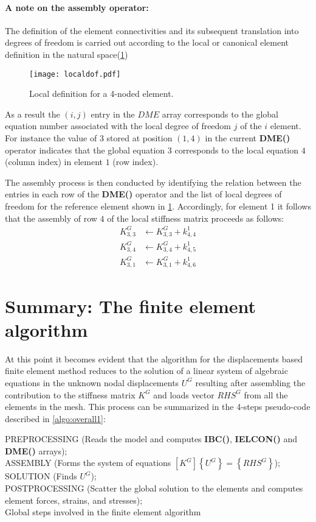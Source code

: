 \paragraph*{A note on the assembly operator:}
The definition of the element connectivities and its subsequent translation into degrees of freedom is carried out according to the local or canonical element definition in the natural space(\cref{fig:locdof})

\begin{figure}[H]
\centering
\texttt{[image: localdof.pdf]}
\caption{Local definition for a 4-noded element.}
\label{fig:locdof}
\end{figure}

As a result the $(i,j)$ entry in the $DME$ array corresponds to the global equation number associated with the local degree of freedom $j$ of the $i$ element. For instance the value of $3$ stored at position $(1,4)$ in the current {\bf DME()} operator indicates that the global equation $3$ corresponds to the local equation $4$ (column index) in element $1$ (row index).

The assembly process is then conducted by identifying the relation between the entries in each row of the {\bf DME()} operator and the list of local degrees of freedom for the reference element shown in \cref{fig:locdof}. Accordingly, for element 1 it follows that the assembly of row $4$ of the local stiffness matrix proceeds as follows:
\begin{align*}
K_{3,3}^G & \leftarrow  K_{3,3}^G + k_{4,4}^1 \\
K_{3,4}^G & \leftarrow  K_{3,4}^G + k_{4,5}^1 \\
K_{3,1}^G & \leftarrow  K_{3,1}^G + k_{4,6}^1
\end{align*}


\section{Summary: The finite element algorithm}
At this point it becomes evident that the algorithm for the displacements based finite element method reduces to the solution of a linear system of algebraic equations in the unknown nodal displacements $U^G$ resulting after assembling the contribution to the stiffness matrix $K^G$ and loads vector $RHS^G$ from all the elements in the mesh. This process can be summarized in the 4-steps pseudo-code described in \cref{algo:overall1}:


\begin{algorithm}[H]
\SetAlgoLined
{}
\BlankLine
PREPROCESSING (Reads the model and computes {\bf IBC()}, {\bf IELCON()} and {\bf DME()} arrays);\\
ASSEMBLY (Forms the system of equations $\left[K^G\right]\left\{U^G\right\}=\left\{RHS^G\right\}$);\\
SOLUTION (Finds $U^G$);\\
POSTPROCESSING (Scatter the global solution to the elements and computes element forces, strains, and stresses);\\
\caption{Global steps involved in the finite element algorithm}
\label{algo:overall1}
\end{algorithm}

